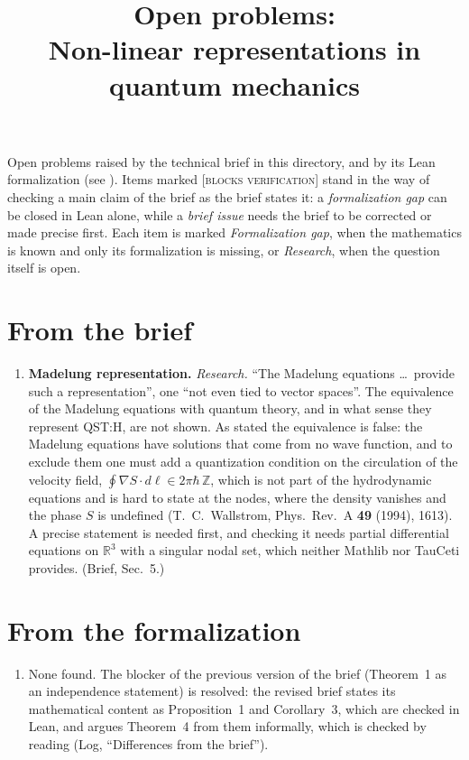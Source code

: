 \documentclass[11pt]{article}
\title{Open problems:\\ Non-linear representations in quantum mechanics}
\author{}
\date{}
\begin{document}
\maketitle

\noindent
Open problems raised by the technical brief in this directory, and by its Lean formalization
(see ).
Items marked \textsc{[blocks verification]} stand in the way of checking a main
claim of the brief as the brief states it: a \emph{formalization gap} can be closed
in Lean alone, while a \emph{brief issue} needs the brief to be corrected or made
precise first.
Each item is marked \emph{Formalization gap}, when the mathematics is known and only its
formalization is missing, or \emph{Research}, when the question itself is open.

\section*{From the brief}
\begin{enumerate}
\item \textbf{Madelung representation.} \emph{Research.} ``The Madelung equations \ldots\
  provide such a representation'', one ``not even tied to vector spaces''. The equivalence of
  the Madelung equations with quantum theory, and in what sense they represent QST:H, are not
  shown. As stated the equivalence is false: the Madelung equations have solutions that come
  from no wave function, and to exclude them one must add a quantization condition on the
  circulation of the velocity field, $\oint \nabla S \cdot d\ell \in 2\pi\hbar\,\mathbb{Z}$,
  which is not part of the hydrodynamic equations and is hard to state at the nodes, where the
  density vanishes and the phase $S$ is undefined (T.~C.~Wallstrom, Phys.\ Rev.\ A \textbf{49}
  (1994), 1613). A precise statement is needed first, and checking it needs partial
  differential equations on $\mathbb{R}^3$ with a singular nodal set, which neither Mathlib nor
  TauCeti provides. (Brief, Sec.~5.)
\end{enumerate}

\section*{From the formalization}
\begin{enumerate}
\item None found. The blocker of the previous version of the brief (Theorem~1 as an
  independence statement) is resolved: the revised brief states its mathematical content as
  Proposition~1 and Corollary~3, which are checked in Lean, and argues Theorem~4 from them
  informally, which is checked by reading (Log, ``Differences from the brief'').
\end{enumerate}
\end{document}
